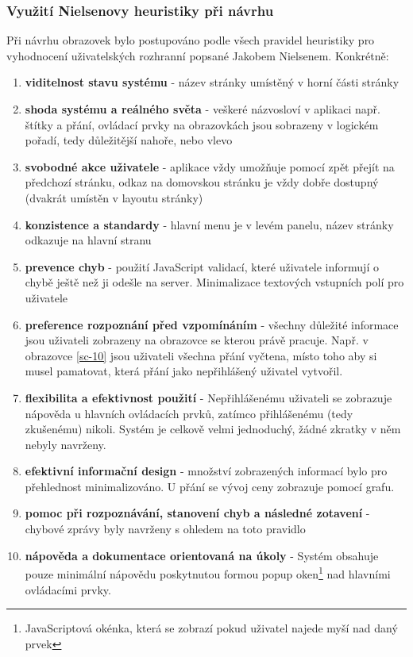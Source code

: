 \subsubsection{Využití Nielsenovy heuristiky při návrhu}
Při návrhu obrazovek bylo postupováno podle všech pravidel heuristiky pro vyhodnocení uživatelských rozhranní popsané Jakobem Nielsenem\cite{molich1990improving}. Konkrétně:
\begin{enumerate}
\item \textbf{viditelnost stavu systému} - název stránky umístěný v horní části stránky
\item \textbf{shoda systému a reálného světa} - veškeré názvosloví v aplikaci např. štítky a přání, ovládací prvky na obrazovkách jsou sobrazeny v logickém pořadí, tedy důležitější nahoře, nebo vlevo
\item \textbf{svobodné akce uživatele} - aplikace vždy umožňuje pomocí zpět přejít na předchozí stránku, odkaz na domovskou stránku je vždy dobře dostupný (dvakrát umístěn v layoutu stránky)
\item \textbf{konzistence a standardy} - hlavní menu je v levém panelu, název stránky odkazuje na hlavní stranu
\item \textbf{prevence chyb} - použití JavaScript validací, které uživatele informují o chybě ještě než ji odešle na server. Minimalizace textových vstupních polí pro uživatele
\item \textbf{preference rozpoznání před vzpomínáním} - všechny důležité informace jsou uživateli zobrazeny na obrazovce se kterou právě pracuje. Např. v obrazovce \ref{sc-10} jsou uživateli všechna přání vyčtena, místo toho aby si musel pamatovat, která přání jako nepřihlášený uživatel vytvořil.
\item \textbf{flexibilita a efektivnost použití} - Nepřihlášenému uživateli se zobrazuje nápověda u hlavních ovládacích prvků, zatímco přihlášenému (tedy zkušenému) nikoli. Systém je celkově velmi jednoduchý, žádné zkratky v něm nebyly navrženy.
\item \textbf{efektivní informační design} - množství zobrazených informací bylo pro přehlednost minimalizováno. U přání se vývoj ceny zobrazuje pomocí grafu.
\item \textbf{pomoc při rozpoznávání, stanovení chyb a následné zotavení} - chybové zprávy byly navrženy s ohledem na toto pravidlo
\item \textbf{nápověda a dokumentace orientovaná na úkoly} - Systém obsahuje pouze minimální nápovědu poskytnutou formou popup oken\footnote{JavaScriptová okénka, která se zobrazí pokud uživatel najede myší nad daný prvek} nad hlavními ovládacími prvky.
\end{enumerate}

